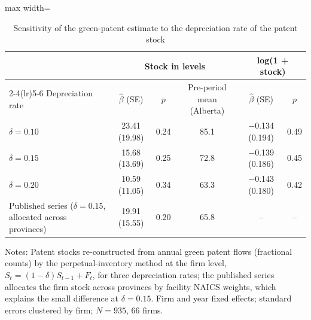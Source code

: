 \begin{table}[htbp]\centering\footnotesize
\caption{Sensitivity of the green-patent estimate to the depreciation rate of the patent stock}
\label{tab:depreciation}
\begin{adjustbox}{max width=\textwidth}
\begin{tabular}{lccccc}
\toprule
 & \multicolumn{3}{c}{Stock in levels} & \multicolumn{2}{c}{log(1 + stock)} \\
\cmidrule(lr){2-4}\cmidrule(lr){5-6}
Depreciation rate & $\hat\beta$ (SE) & $p$ & Pre-period mean (Alberta) & $\hat\beta$ (SE) & $p$ \\
\midrule
$\delta=0.10$ & 23.41 (19.98) & 0.24 & 85.1 & $-$0.134 (0.194) & 0.49 \\
$\delta=0.15$ & 15.68 (13.69) & 0.25 & 72.8 & $-$0.139 (0.186) & 0.45 \\
$\delta=0.20$ & 10.59 (11.05) & 0.34 & 63.3 & $-$0.143 (0.180) & 0.42 \\
\addlinespace
Published series ($\delta=0.15$, allocated across provinces) & 19.91 (15.55) & 0.20 & 65.8 & -- & -- \\
\bottomrule
\end{tabular}
\end{adjustbox}
\par\vspace{3pt}\begin{minipage}{\textwidth}\footnotesize
Notes: Patent stocks re-constructed from annual green patent flows (fractional counts) by the perpetual-inventory method at the firm level, $S_t=(1-\delta)S_{t-1}+F_t$, for three depreciation rates; the published series allocates the firm stock across provinces by facility NAICS weights, which explains the small difference at $\delta=0.15$. Firm and year fixed effects; standard errors clustered by firm; $N=935$, 66 firms.
\end{minipage}
\end{table}
